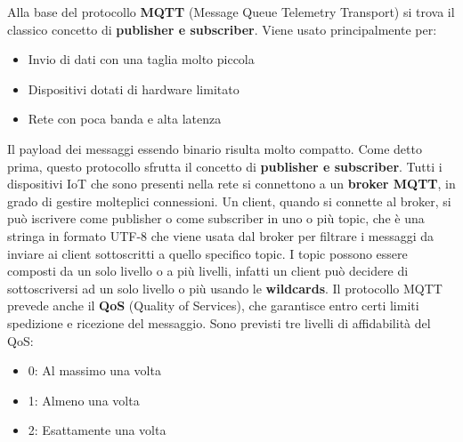 \documentclass[10pt,a4paper,oneside]{scrbook}
\begin{document}
Alla base del protocollo \textbf{MQTT} (Message Queue Telemetry Transport) si trova il classico concetto di \textbf{publisher e subscriber}.
Viene usato principalmente per:
\begin{itemize}
    \item Invio di dati con una taglia molto piccola
    \item Dispositivi dotati di hardware limitato
    \item Rete con poca banda e alta latenza
\end{itemize}
Il payload dei messaggi essendo binario risulta molto compatto. Come detto prima, questo protocollo sfrutta il concetto di \textbf{publisher e subscriber}.
Tutti i dispositivi IoT che sono presenti nella rete si connettono a un \textbf{broker MQTT}, in grado di gestire molteplici connessioni.
Un client, quando si connette al broker, si può iscrivere come publisher o come subscriber in uno o più topic, che è una stringa in formato UTF-8 che viene
usata dal broker per filtrare i messaggi da inviare ai client sottoscritti a quello specifico topic.
I topic possono essere composti da un solo livello o a più livelli, infatti un client può decidere di sottoscriversi ad un solo livello o più usando le \textbf{wildcards}.
Il protocollo MQTT prevede anche il \textbf{QoS} (Quality of Services), che garantisce entro certi limiti spedizione e ricezione del messaggio.
Sono previsti tre livelli di affidabilità del QoS:
\begin{itemize}
    \item 0: Al massimo una volta
    \item 1: Almeno una volta
    \item 2: Esattamente una volta
\end{itemize}
\end{document}
